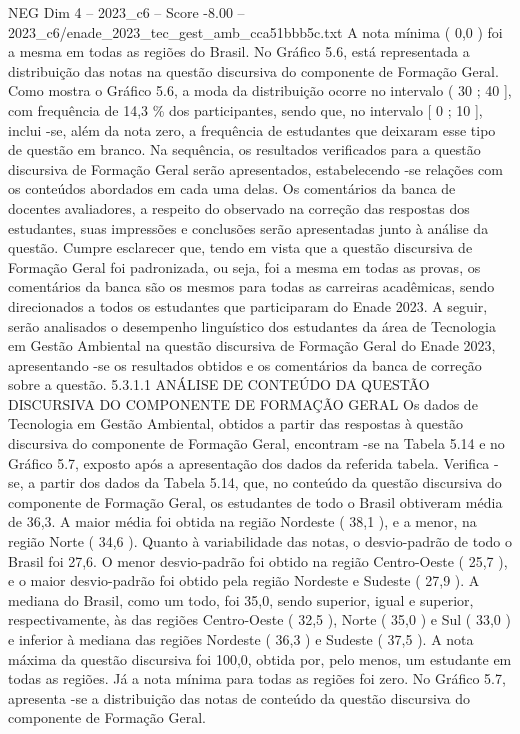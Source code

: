 \begin{textsample}{NEG Dim 4 – 2023\_c6 – Score -8.00 – 2023\_c6/enade\_2023\_tec\_gest\_amb\_cca51bbb5c.txt}
A nota mínima ( 0,0 ) foi a mesma em todas as regiões do Brasil.
No Gráfico 5.6, está representada a distribuição das notas na questão discursiva do componente de Formação Geral.
Como mostra o Gráfico 5.6, a moda da distribuição ocorre no intervalo ( 30 ; 40 ], com frequência de 14,3 \% dos participantes, sendo que, no intervalo [ 0 ; 10 ], inclui -se, além da nota zero, a frequência de estudantes que deixaram esse tipo de questão em branco.
Na sequência, os resultados verificados para a questão discursiva de Formação Geral serão apresentados, estabelecendo -se relações com os conteúdos abordados em cada uma delas.
Os comentários da banca de docentes avaliadores, a respeito do observado na correção das respostas dos estudantes, suas impressões e conclusões serão apresentadas junto à análise da questão.
Cumpre esclarecer que, tendo em vista que a questão discursiva de Formação Geral foi padronizada, ou seja, foi a mesma em todas as provas, os comentários da banca são os mesmos para todas as carreiras acadêmicas, sendo direcionados a todos os estudantes que participaram do Enade 2023.
A seguir, serão analisados o desempenho linguístico dos estudantes da área de Tecnologia em Gestão Ambiental na questão discursiva de Formação Geral do Enade 2023, apresentando -se os resultados obtidos e os comentários da banca de correção sobre a questão. 5.3.1.1 ANÁLISE DE CONTEÚDO DA QUESTÃO DISCURSIVA DO COMPONENTE DE FORMAÇÃO GERAL Os dados de Tecnologia em Gestão Ambiental, obtidos a partir das respostas à questão discursiva do componente de Formação Geral, encontram -se na Tabela 5.14 e no Gráfico 5.7, exposto após a apresentação dos dados da referida tabela.
Verifica -se, a partir dos dados da Tabela 5.14, que, no conteúdo da questão discursiva do componente de Formação Geral, os estudantes de todo o Brasil obtiveram média de 36,3.
A maior média foi obtida na região Nordeste ( 38,1 ), e a menor, na região Norte ( 34,6 ).
Quanto à variabilidade das notas, o desvio-padrão de todo o Brasil foi 27,6.
O menor desvio-padrão foi obtido na região Centro-Oeste ( 25,7 ), e o maior desvio-padrão foi obtido pela região Nordeste e Sudeste ( 27,9 ).
A mediana do Brasil, como um todo, foi 35,0, sendo superior, igual e superior, respectivamente, às das regiões Centro-Oeste ( 32,5 ), Norte ( 35,0 ) e Sul ( 33,0 ) e inferior à mediana das regiões Nordeste ( 36,3 ) e Sudeste ( 37,5 ).
A nota máxima da questão discursiva foi 100,0, obtida por, pelo menos, um estudante em todas as regiões.
Já a nota mínima para todas as regiões foi zero.
No Gráfico 5.7, apresenta -se a distribuição das notas de conteúdo da questão discursiva do componente de Formação Geral.

\end{textsample}

